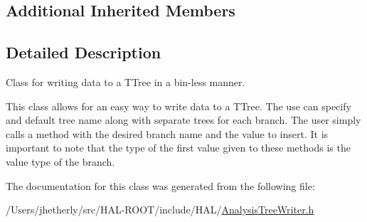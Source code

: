 \subsection*{Additional Inherited Members}


\subsection{Detailed Description}
Class for writing data to a T\+Tree in a bin-\/less manner. 

This class allows for an easy way to write data to a T\+Tree. The use can specify and default tree name along with separate trees for each branch. The user simply calls a method with the desired branch name and the value to insert. It is important to note that the type of the first value given to these methods is the value type of the branch. 

The documentation for this class was generated from the following file\+:\begin{DoxyCompactItemize}
\item 
/\+Users/jhetherly/src/\+H\+A\+L-\/\+R\+O\+O\+T/include/\+H\+A\+L/\hyperlink{_analysis_tree_writer_8h}{Analysis\+Tree\+Writer.\+h}\end{DoxyCompactItemize}
